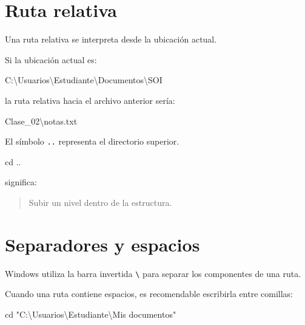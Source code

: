 \documentclass[
  spanish,
  letterpaper,
]{scrbook}
\newenvironment{Shaded}{\begin{snugshade}}{\end{snugshade}}
\newcommand{\NormalTok}[1]{\textcolor[rgb]{0.00,0.23,0.31}{#1}}
\begin{document}
\section{Ruta relativa}\label{ruta-relativa}

Una ruta relativa se interpreta desde la ubicación actual.

Si la ubicación actual es:

\begin{Shaded}
\begin{Highlighting}[]
\NormalTok{C:\textbackslash{}Usuarios\textbackslash{}Estudiante\textbackslash{}Documentos\textbackslash{}SOI}
\end{Highlighting}
\end{Shaded}

la ruta relativa hacia el archivo anterior sería:

\begin{Shaded}
\begin{Highlighting}[]
\NormalTok{Clase\_02\textbackslash{}notas.txt}
\end{Highlighting}
\end{Shaded}

El símbolo \texttt{..} representa el directorio superior.

\begin{Shaded}
\begin{Highlighting}[]
\NormalTok{cd ..}
\end{Highlighting}
\end{Shaded}

significa:

\begin{quote}
Subir un nivel dentro de la estructura.
\end{quote}

\section{Separadores y espacios}\label{separadores-y-espacios}

Windows utiliza la barra invertida \texttt{\textbackslash{}} para
separar los componentes de una ruta.

Cuando una ruta contiene espacios, es recomendable escribirla entre
comillas:

\begin{Shaded}
\begin{Highlighting}[]
\NormalTok{cd "C:\textbackslash{}Usuarios\textbackslash{}Estudiante\textbackslash{}Mis documentos"}
\end{Highlighting}
\end{Shaded}
\end{document}
